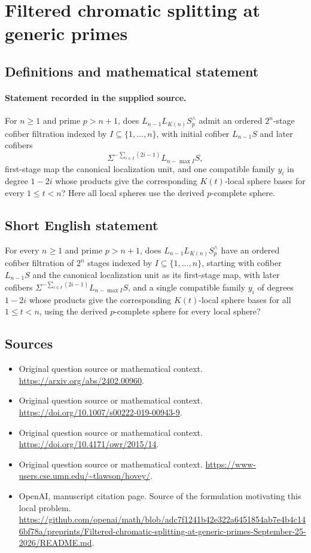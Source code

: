 \documentclass[11pt]{article}
\begin{document}
\section*{Filtered chromatic splitting at generic primes}\label{statement}
\subsection{Definitions and mathematical statement}
\paragraph{Statement recorded in the supplied source.}
For $n\geq1$ and prime $p>n+1$, does $L_{n-1}L_{K(n)}S_p^\wedge$ admit an ordered $2^n$-stage cofiber filtration indexed by $I\subseteq\{1,\ldots,n\}$, with initial cofiber $L_{n-1}S$ and later cofibers
\[
\Sigma^{-\sum_{i\in I}(2i-1)}L_{n-\max I}S,
\]
first-stage map the canonical localization unit, and one compatible family $y_i$ in degree $1-2i$ whose products give the corresponding $K(t)$-local sphere bases for every $1\leq t<n$? Here all local spheres use the derived $p$-complete sphere.
\subsection{Short English statement}
For every $n\geq1$ and prime $p>n+1$, does $L_{n-1}L_{K(n)}S_p^\wedge$ have an ordered cofiber filtration of $2^n$ stages indexed by $I\subseteq\{1,\ldots,n\}$, starting with cofiber $L_{n-1}S$ and the canonical localization unit as its first-stage map, with later cofibers $\Sigma^{-\sum_{i\in I}(2i-1)}L_{n-\max I}S$, and a single compatible family $y_i$ of degrees $1-2i$ whose products give the corresponding $K(t)$-local sphere bases for all $1\leq t<n$, using the derived $p$-complete sphere for every local sphere?
\subsection{Sources}
\begin{itemize}
\item[S1] Original question source or mathematical context.
\url{https://arxiv.org/abs/2402.00960}.
\item[S2] Original question source or mathematical context.
\url{https://doi.org/10.1007/s00222-019-00943-9}.
\item[S3] Original question source or mathematical context.
\url{https://doi.org/10.4171/owr/2015/14}.
\item[S4] Original question source or mathematical context.
\url{https://www-users.cse.umn.edu/~tlawson/hovey/}.
\item[S5] OpenAI, manuscript citation page. Source of the formulation motivating this local problem.
\url{https://github.com/openai/math/blob/adc7f1241b42e322a6451854ab7e4b4c146bf78a/preprints/Filtered-chromatic-splitting-at-generic-primes-September-25-2026/README.md}.
\end{itemize}
\end{document}

